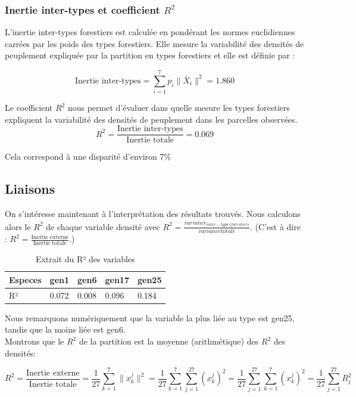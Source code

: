 \documentclass{article}
\begin{document}
\subsubsection{Inertie inter-types et coefficient $R^2$}
\label{subsec : Inertie inter-types et coefficient}


L'inertie inter-types forestiers est calculée en pondérant les normes euclidiennes carrées par les poids des types forestiers. Elle mesure la variabilité des densités de peuplement expliquée par la partition en types forestiers et elle est définie par :

\[
\text{Inertie inter-types} = \sum_{i=1}^{7} p_i \|\bar{X}_i\|^2 = 1.860
\]

Le coefficient $R^2$ nous permet d'évaluer dans quelle mesure les types forestiers expliquent la variabilité des densités de peuplement dans les parcelles observées.
\[
R^2 = \frac{\text{Inertie inter-types}}{\text{Inertie totale}}=0.069
\]

Cela correspond à une disparité d'environ 7\%

\subsection{Liaisons}

On s'intéresse maintenant à l'interprétation des résultats trouvés. Nous calculons alors le \( R^2 \) de chaque variable densité avec $R^2 = \frac{variance_{inter -typesforestiers}}{variance totale}$.
(C'est à dire : \( R^2 = \frac{\text{Inertie externe}}{\text{Inertie totale}} \).)

\begin{table}[H]
    \centering
    \caption{Extrait du R² des variables}
    \label{tab:statistiques Partie1 a rap avec II.1.b}
    \begin{tabular}{|l|l|l|l|l|}
    \hline
    Especes & gen1  & gen6  & gen17 & gen25 \\ \hline
    R²      & 0.072 & 0.008 & 0.096 & 0.184 \\ \hline
    \end{tabular}
    \centering
\end{table}


    Nous remarquons numériquement que la variable la plus liée au type est gen25, tandis que la moins liée est gen6. 
    \\
    Montrons que le \( R^2 \) de la partition est la moyenne (arithmétique) des \( R^2 \) des densités:

\[
R^2 = \frac{\text{Inertie externe}}{\text{Inertie totale}}
= \frac{1}{27} \sum_{k=1}^{7} \lVert x_k^j \rVert^2
= \frac{1}{27} \sum_{k=1}^{7} \sum_{j=1}^{27} (x_k^j)^2
= \frac{1}{27} \sum_{j=1}^{27} \sum_{k=1}^{7} (x_k^j)^2
= \frac{1}{27} \sum_{j=1}^{27} R_j^2
\]
\end{document}
